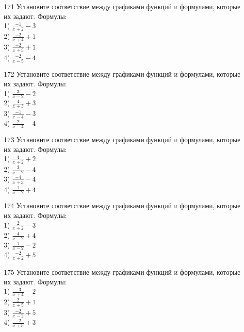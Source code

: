 \documentclass[4apaper]{article}
\begin{document}
\begin{taskBN}{171}
Установите соответствие между графиками функций и формулами, которые их задают. Формулы: \\1) $\frac{-1}{x+2}-3$\\2) $\frac{-2}{x+4}+1$\\3) $\frac{-2}{x+5}+1$\\4) $\frac{-2}{x-5}-4$
\end{taskBN}

\begin{taskBN}{172}
Установите соответствие между графиками функций и формулами, которые их задают. Формулы: \\1) $\frac{3}{x-2}-2$\\2) $\frac{4}{x+3}+3$\\3) $\frac{-1}{x-4}-3$\\4) $\frac{2}{x-4}-4$
\end{taskBN}

\begin{taskBN}{173}
Установите соответствие между графиками функций и формулами, которые их задают. Формулы: \\1) $\frac{4}{x+2}+2$\\2) $\frac{3}{x-2}-4$\\3) $\frac{-4}{x+3}-4$\\4) $\frac{1}{x-2}+4$
\end{taskBN}

\begin{taskBN}{174}
Установите соответствие между графиками функций и формулами, которые их задают. Формулы: \\1) $\frac{2}{x+2}-3$\\2) $\frac{4}{x-2}+4$\\3) $\frac{1}{x-2}-2$\\4) $\frac{-2}{x+2}+5$
\end{taskBN}

\begin{taskBN}{175}
Установите соответствие между графиками функций и формулами, которые их задают. Формулы: \\1) $\frac{-3}{x+4}-2$\\2) $\frac{2}{x+5}+1$\\3) $\frac{-2}{x-2}+5$\\4) $\frac{-2}{x+5}+3$
\end{taskBN}
\end{document}
